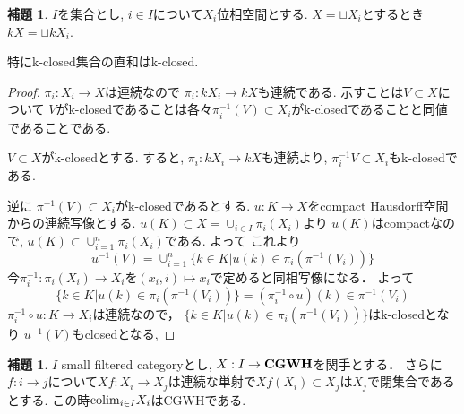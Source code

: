 \documentclass[dvipdfmx,a4paper,11pt]{article}
\newcommand{\colim}{{\rm colim}}
\theoremstyle{definition}
\newtheorem{lem}[thm]{補題}
\newcommand{\xr}[1]{\textcolor{red}{#1}}
\begin{document}
\begin{tcolorbox}
 [colback = white, colframe = green!35!black, fonttitle = \bfseries,breakable = true]
\begin{lem}
\label{lem-k-space}
$I$を集合とし, $i \in I$について$X_i$位相空間とする. 
$X = \sqcup X_{i}$とするとき$kX = \sqcup kX_i$.

特にk-closed集合の直和はk-closed.
\end{lem}
\end{tcolorbox}
\begin{proof}
$\pi_i : X_i \to X$は連続なので
$\pi_i : kX_i \to kX$も連続である.
示すことは$V \subset X$について
$V$がk-closedであることは各々$\pi_{i}^{-1}(V) \subset X_i$がk-closedであることと同値であることである. 

$V \subset X$がk-closedとする.
すると, $\pi_{i}: kX_i \to kX$も連続より, $\pi_{i}^{-1}V \subset X_i$もk-closedである.

逆に $\pi^{-1}(V) \subset X_i$がk-closedであるとする. 
$u : K\to X$をcompact Hausdorff空間からの連続写像とする. 
$u(K) \subset X = \cup_{i \in I}\pi_{i}(X_i)$より
$u(K)$はcompactなので, $u(K) \subset \cup_{i=1}^{n}\pi_{i}(X_i)$である.
よって
これより
$$
u^{-1}(V)
=\cup_{i=1}^{n}\{ k \in K | u(k) \in \pi_{i}( \pi^{-1}(V_i)) \}
$$
今$\pi_{i}^{-1}: \pi_{i}(X_i) \to X_i$を$(x_i, i) \mapsto x_i$で定めると同相写像になる．
よって
$$
\{ k \in K | u(k) \in \pi_{i}( \pi^{-1}(V_i)) \}
=
(\pi_{i}^{-1}\circ u)(k) \in \pi^{-1}(V_i)
$$
$\pi_{i}^{-1}\circ u : K \to X_i$は連続なので， $\{ k \in K | u(k) \in \pi_{i}( \pi^{-1}(V_i)) \}$はk-closedとなり
$u^{-1}(V)$もclosedとなる, 
\end{proof}


\begin{tcolorbox}
 [colback = white, colframe = green!35!black, fonttitle = \bfseries,breakable = true]

\begin{lem}\cite[Lemma 3.3]{Str}
\label{lem-weakhaus-2}
$I$ small filtered categoryとし, $X : I \to {\bf CGWH}$を関手とする． 
さらに$f: i \to j$について$Xf : X_i \to X_j$は連続な単射で$Xf(X_i) \subset X_j$は$X_j$で閉集合であるとする. 
この時$\colim_{i \in I}X_i$はCGWHである. 
\end{lem}
\end{tcolorbox}
\end{document}
